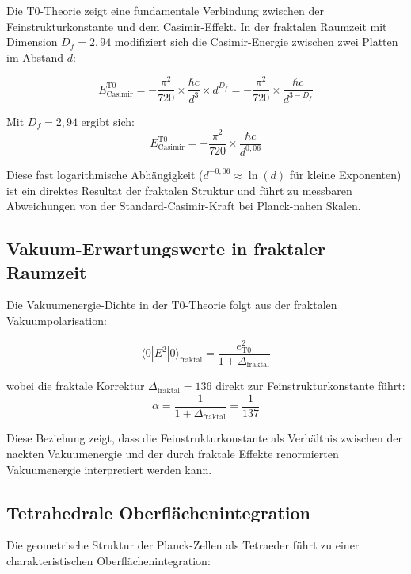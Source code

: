 \documentclass[12pt,a4paper]{article}
\theoremstyle{definition}
\begin{document}
	Die T0-Theorie zeigt eine fundamentale Verbindung zwischen der Feinstrukturkonstante und dem Casimir-Effekt. In der fraktalen Raumzeit mit Dimension $D_f = 2{,}94$ modifiziert sich die Casimir-Energie zwischen zwei Platten im Abstand $d$:
	
	\begin{equation}
		E_{\text{Casimir}}^{\text{T0}} = -\frac{\pi^2}{720} \times \frac{\hbar c}{d^3} \times d^{D_f} = -\frac{\pi^2}{720} \times \frac{\hbar c}{d^{3-D_f}}
	\end{equation}
	
	Mit $D_f = 2{,}94$ ergibt sich:
	\begin{equation}
		E_{\text{Casimir}}^{\text{T0}} = -\frac{\pi^2}{720} \times \frac{\hbar c}{d^{0{,}06}}
	\end{equation}
	
	Diese fast logarithmische Abhängigkeit ($d^{-0{,}06} \approx \ln(d)$ für kleine Exponenten) ist ein direktes Resultat der fraktalen Struktur und führt zu messbaren Abweichungen von der Standard-Casimir-Kraft bei Planck-nahen Skalen.
	
	\subsection{Vakuum-Erwartungswerte in fraktaler Raumzeit}
	
	Die Vakuumenergie-Dichte in der T0-Theorie folgt aus der fraktalen Vakuumpolarisation:
	
	\begin{equation}
		\langle 0|E^2|0 \rangle_{\text{fraktal}} = \frac{e_{\text{T0}}^2}{1 + \Delta_{\text{fraktal}}}
	\end{equation}
	
	wobei die fraktale Korrektur $\Delta_{\text{fraktal}} = 136$ direkt zur Feinstrukturkonstante führt:
	\begin{equation}
		\alpha = \frac{1}{1 + \Delta_{\text{fraktal}}} = \frac{1}{137}
	\end{equation}
	
	Diese Beziehung zeigt, dass die Feinstrukturkonstante als Verhältnis zwischen der nackten Vakuumenergie und der durch fraktale Effekte renormierten Vakuumenergie interpretiert werden kann.
	
	\subsection{Tetrahedrale Oberflächenintegration}
	
	Die geometrische Struktur der Planck-Zellen als Tetraeder führt zu einer charakteristischen Oberflächenintegration:
	
\end{document}
